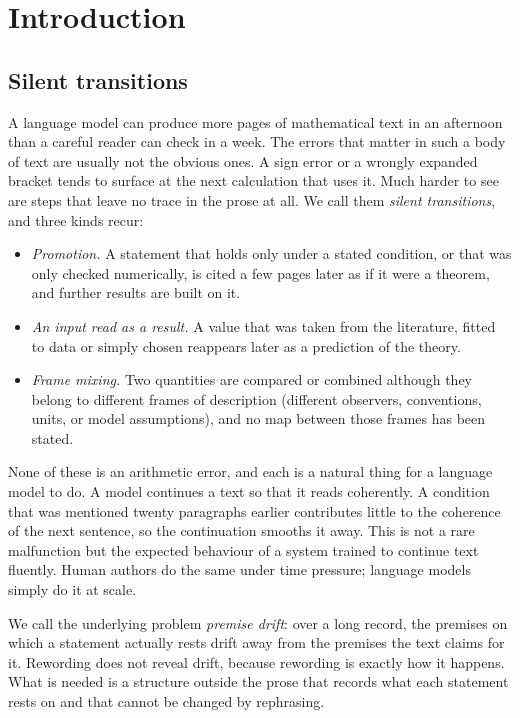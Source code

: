 \section{Introduction}\label{sec:intro}

\subsection{Silent transitions}

A language model can produce more pages of mathematical text in an afternoon than a careful reader can check in a week. The errors
that matter in such a body of text are usually not the obvious ones. A sign error or a wrongly expanded bracket tends to surface at the
next calculation that uses it. Much harder to see are steps that leave no trace in the prose at all. We call them \emph{silent
transitions}, and three kinds recur:
\begin{itemize}[leftmargin=1.5em]
\item \emph{Promotion.} A statement that holds only under a stated condition, or that was only checked numerically, is cited a few
pages later as if it were a theorem, and further results are built on it.
\item \emph{An input read as a result.} A value that was taken from the literature, fitted to data or simply chosen reappears later
as a prediction of the theory.
\item \emph{Frame mixing.} Two quantities are compared or combined although they belong to different frames of description (different
observers, conventions, units, or model assumptions), and no map between those frames has been stated.
\end{itemize}
None of these is an arithmetic error, and each is a natural thing for a language model to do. A model continues a text so that it reads
coherently. A condition that was mentioned twenty paragraphs earlier contributes little to the coherence of the next sentence, so the
continuation smooths it away. This is not a rare malfunction but the expected behaviour of a system trained to continue text fluently.
Human authors do the same under time pressure; language models simply do it at scale.

We call the underlying problem \emph{premise drift}: over a long record, the premises on which a statement actually rests
drift away from the premises the text claims for it. Rewording does not reveal drift, because rewording is exactly how it happens.
What is needed is a structure outside the prose that records what each statement rests on and that cannot be changed by
rephrasing.

